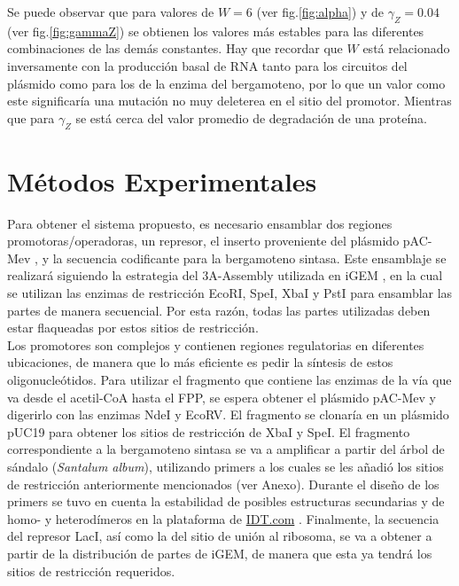 \documentclass[12pt]{article}
\begin{document}
Se puede observar que para valores de $W = 6 $ (ver fig.\ref{fig:alpha}) y de $\gamma _Z = 0.04$ (ver fig.\ref{fig:gammaZ}) se obtienen los valores m\'as estables para las diferentes combinaciones de las dem\'as constantes. Hay que recordar que $W$ est\'a relacionado inversamente con la producci\'on basal de RNA tanto para los circuitos del pl\'asmido como para los de la enzima del bergamoteno, por lo que un valor como este significar\'ia una mutaci\'on no muy deleterea en el sitio del promotor. Mientras que para $\gamma _Z$ se est\'a cerca del valor promedio de degradaci\'on de una prote\'ina.

\section{M\'etodos Experimentales}

Para obtener el sistema propuesto, es necesario ensamblar dos regiones promotoras/operadoras, un represor, el inserto proveniente del plásmido pAC-Mev \cite{harada09a}, y la secuencia codificante para la bergamoteno sintasa. Este ensamblaje se realizará siguiendo la estrategia del 3A-Assembly utilizada en iGEM \cite{igem}, en la cual se utilizan las enzimas de restricción EcoRI, SpeI, XbaI y PstI para ensamblar las partes de manera secuencial. Por esta razón, todas las partes utilizadas deben estar flaqueadas por estos sitios de restricción.\\

Los promotores son complejos y contienen regiones regulatorias en diferentes ubicaciones, de manera que lo más eficiente es pedir la síntesis de estos oligonucleótidos. Para utilizar el fragmento que contiene las enzimas de la vía que va desde el acetil-CoA hasta el FPP, se espera obtener el plásmido pAC-Mev y digerirlo con las enzimas NdeI y EcoRV. El fragmento se clonaría en un plásmido pUC19 para obtener los sitios de restricción de XbaI y SpeI. El fragmento correspondiente a la bergamoteno sintasa se va a amplificar a partir del árbol de sándalo (\emph{Santalum album}), utilizando primers a los cuales se les añadió los sitios de restricción anteriormente mencionados (ver Anexo). Durante el diseño de los primers se tuvo en cuenta la estabilidad de posibles estructuras secundarias y de homo- y heterodímeros en la plataforma de \url{IDT.com} \cite{owczarzy08}. Finalmente, la secuencia del represor LacI, así como la del sitio de unión al ribosoma, se va a obtener a partir de la distribución de partes de iGEM, de manera que esta ya tendrá los sitios de restricción requeridos.\\
\end{document}

